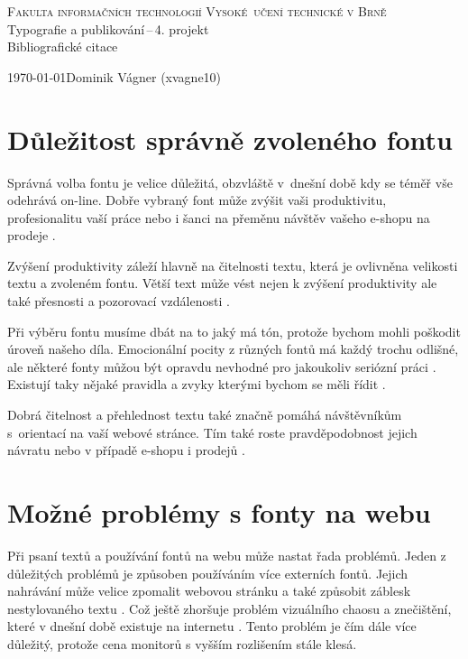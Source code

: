 \documentclass[a4paper, 11pt]{article}
\begin{document}
\begin{titlepage}
\begin{center}
\Huge
\textsc{Fakulta informačních technologií Vysoké~učení technické v Brně} \\
\LARGE
Typografie a publikování\,--\,4. projekt \\
Bibliografické citace \\
\end{center}
\Large \today \hfill Dominik Vágner (xvagne10)
\end{titlepage}

\section{Důležitost správně zvoleného fontu}
Správná volba fontu je velice důležitá, obzvláště v~dnešní době kdy se téměř vše odehrává on-line. Dobře vybraný font může zvýšit vaši produktivitu, profesionalitu vaší práce nebo i šanci na přeměnu návštěv vašeho e-shopu na prodeje \cite{hyndman2016fonts}. 

Zvýšení produktivity záleží hlavně na čitelnosti textu, která je ovlivněna velikosti textu a zvoleném fontu. Větší text může vést nejen k zvýšení produktivity ale také přesnosti a pozorovací vzdálenosti \cite{healio_2014}. 

Při výběru fontu musíme dbát na to jaký má tón, protože bychom mohli poškodit úroveň našeho díla. Emocionální pocity z různých fontů má každý trochu odlišné, ale některé fonty můžou být opravdu nevhodné pro jakoukoliv seriózní práci \cite{1245492}. Existují taky nějaké pravidla a zvyky kterými bychom se měli řídit \cite{Sirucek2007thesis}.

Dobrá čitelnost a přehlednost textu také značně pomáhá návštěvníkům s~orientací na vaší webové stránce. Tím také roste pravděpodobnost jejich návratu nebo v případě e-shopu i prodejů \cite{turner_2021}.

\section{Možné problémy s fonty na webu}
Při psaní textů a používání fontů na webu může nastat řada problémů. Jeden z důležitých problémů je způsoben používáním více externích fontů. Jejich nahrávání může velice zpomalit webovou stránku a také způsobit záblesk nestylovaného textu \cite{salminen_2016}. Což ještě zhoršuje problém vizuálního chaosu a znečištění, které v dnešní době existuje na internetu \cite{RajlichJan1998Tpt}. Tento problém je čím dále více důležitý, protože cena monitorů s vyšším rozlišením stále klesá.
\end{document}
